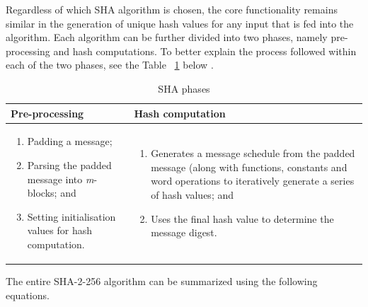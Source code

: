     Regardless of which SHA algorithm is chosen, the core functionality remains similar in the generation of unique hash values for any input that is fed into the algorithm. Each algorithm can be further divided into two phases, namely pre-processing and hash computations. To better explain the process followed within each of the two phases, see the Table ~\ref{table: SHA phases} below \cite{Foti2015}.
    
    
    \begin{table}[h]
        \caption{SHA phases}
        \begin{tabular}{|p{} | p{}|}
          \hline
         \textbf{Pre-processing} & \textbf{Hash computation} \\
         \hline\hline
            \begin{enumerate}
                \item Padding a message;
                \item Parsing the padded message into \textit{m}-blocks; and
                \item Setting initialisation values for hash computation.
            \end{enumerate}
             & 
             \begin{enumerate}
                 \item Generates a message schedule from the padded message (along with functions, constants and word operations to iteratively generate a series of hash values; and
                 \item Uses the final hash value to determine the message digest.
             \end{enumerate} \\
             \hline
        \end{tabular}
        \label{table: SHA phases}
    \end{table}
    
    The entire SHA-2-256 algorithm can be summarized using the following equations.
    
    
